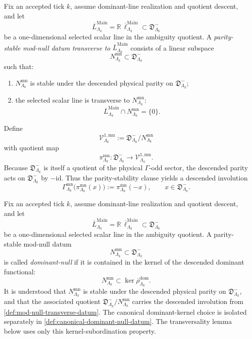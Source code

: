 \documentclass[11pt]{article}
\begin{document}
\begin{definition}
\label{def:mod-null-transverse-datum}
Fix an accepted tick \(k\), assume dominant-line realization and quotient descent, and let
\[
\overline L^{\mathrm{Main}}_{\Lambda_k}
=
\mathbb R\,\overline\ell^{\mathrm{Main}}_{\Lambda_k}
\subset
\mathfrak D^-_{\Lambda_k}
\]
be a one-dimensional selected scalar line in the ambiguity quotient.
A \emph{parity-stable mod-null datum transverse to}
\(
\overline L^{\mathrm{Main}}_{\Lambda_k}
\)
consists of a linear subspace
\[
N^{\mathrm{mn}}_{\Lambda_k}\subset \mathfrak D^-_{\Lambda_k}
\]
such that:
\begin{enumerate}[leftmargin=2em,label=(\alph*)]
\item \(N^{\mathrm{mn}}_{\Lambda_k}\) is stable under the descended physical parity on
  \(\mathfrak D^-_{\Lambda_k}\);
\item the selected scalar line is transverse to \(N^{\mathrm{mn}}_{\Lambda_k}\):
  \[
  \overline L^{\mathrm{Main}}_{\Lambda_k}\cap N^{\mathrm{mn}}_{\Lambda_k}=\{0\}.
  \]
\end{enumerate}
Define
\[
\mathcal V^{1,\mathrm{mn}}_{\Lambda_k}
:=
\mathfrak D^-_{\Lambda_k}/N^{\mathrm{mn}}_{\Lambda_k}
\]
with quotient map
\[
\pi^{\mathrm{mn}}_{\Lambda_k}:
\mathfrak D^-_{\Lambda_k}\to \mathcal V^{1,\mathrm{mn}}_{\Lambda_k}.
\]
Because \(\mathfrak D^-_{\Lambda_k}\) is itself a quotient of the physical \(\Gamma\)-odd sector,
the descended parity acts on \(\mathfrak D^-_{\Lambda_k}\) by \(-\mathrm{id}\).
Thus the parity-stability clause yields a descended involution
\[
\Gamma^{\mathrm{mn}}_{\Lambda_k}
\bigl(
\pi^{\mathrm{mn}}_{\Lambda_k}(x)
\bigr)
:=
\pi^{\mathrm{mn}}_{\Lambda_k}(-x),
\qquad
x\in \mathfrak D^-_{\Lambda_k}.
\]
\end{definition}

\begin{definition}
\label{def:dominant-null-mod-null-datum}
Fix an accepted tick \(k\), assume dominant-line realization and quotient descent, and let
\[
\overline L^{\mathrm{Main}}_{\Lambda_k}
=
\mathbb R\,\overline\ell^{\mathrm{Main}}_{\Lambda_k}
\subset
\mathfrak D^-_{\Lambda_k}
\]
be a one-dimensional selected scalar line in the ambiguity quotient.
A parity-stable mod-null datum
\[
N^{\mathrm{mn}}_{\Lambda_k}\subset \mathfrak D^-_{\Lambda_k}
\]
is called \emph{dominant-null} if it is contained in the kernel of the descended dominant
functional:
\[
N^{\mathrm{mn}}_{\Lambda_k}\subset \ker \overline{\rho}^{\mathrm{dom}}_{\Lambda_k}.
\]
It is understood that
\(
N^{\mathrm{mn}}_{\Lambda_k}
\)
is stable under the descended physical parity on
\(
\mathfrak D^-_{\Lambda_k}
\),
and that the associated quotient
\(
\mathfrak D^-_{\Lambda_k}/N^{\mathrm{mn}}_{\Lambda_k}
\)
carries the descended involution from \cref{def:mod-null-transverse-datum}.
The canonical dominant-kernel choice is isolated separately in
\cref{def:canonical-dominant-null-datum}.
The transversality lemma below uses only this kernel-subordination property.
\end{definition}
\end{document}
